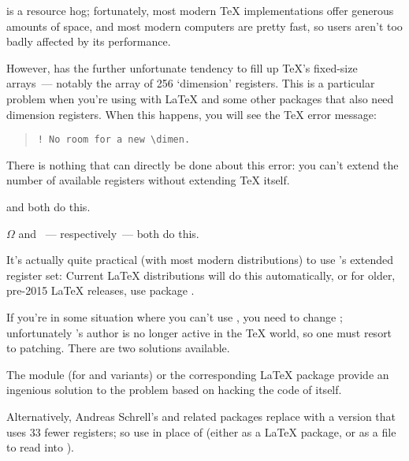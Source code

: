 \pictex{} is a resource hog; fortunately, most modern \TeX{}
implementations offer generous amounts of space, and most modern
computers are pretty fast, so users aren't too badly affected by its
performance.

However, \pictex{} has the further unfortunate tendency to fill up
\TeX{}'s fixed-size arrays~--- notably the array of 256 `dimension'
registers.  This is a particular problem when you're using
 with \LaTeX{} and some other packages that also need
dimension registers.  When this happens, you will see the \TeX{} error
message:
\begin{quote}
\begin{verbatim}
! No room for a new \dimen.
\end{verbatim}
\end{quote}
There is nothing that can directly be done about this error: you
can't extend the number of available  registers without
extending \TeX{} itself.
\begin{wideversion} %
   and  both do this.
\end{wideversion}
\begin{narrowversion}
  \ensuremath{\Omega} and \eTeX{}~---
   respectively~--- both do this.
\end{narrowversion}

It's actually quite practical (with most modern distributions) to use
\eTeX{}'s extended register set:  Current \LaTeX{} distributions
will do this automatically, or for older, pre-2015 \LaTeX{}
releases, use package .

If you're in some situation where you can't use \eTeX{}, you need to change
\pictex{}; unfortunately \pictex{}'s author is no longer active in the
\TeX{} world, so one must resort to patching.  There are two solutions
available.

The \CONTeXT{} module  (for \plaintex{} and
variants) or the corresponding \LaTeX{}  package provide
an ingenious solution to the problem based on hacking the code of
 itself.

Alternatively, Andreas Schrell's  and related
packages replace \pictex{} with a version that uses 33 fewer
 registers; so use  in place of
 (either as a \LaTeX{} package, or as a file to read
into \plaintex{}).

